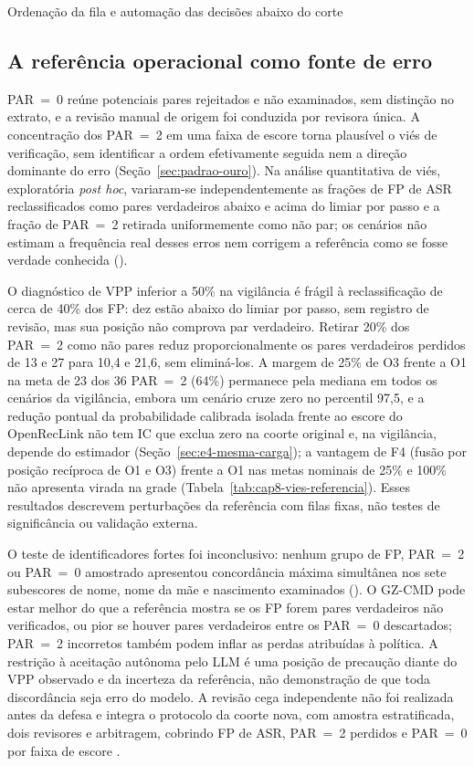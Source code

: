 \begin{chapter}{Ordenação da fila e automação das decisões abaixo do corte}
\subsection{A referência operacional como fonte de erro}\label{sec:e4-vies-referencia}

PAR~=~0 reúne potenciais pares rejeitados e não examinados, sem distinção no extrato, e a revisão manual de origem foi conduzida por revisora única. A concentração dos PAR~=~2 em uma faixa de escore torna plausível o viés de verificação, sem identificar a ordem efetivamente seguida nem a direção dominante do erro (Seção~\ref{sec:padrao-ouro}). Na análise quantitativa de viés, exploratória \textit{post hoc}, variaram-se independentemente as frações de FP de ASR reclassificados como pares verdadeiros abaixo e acima do limiar por passo e a fração de PAR~=~2 retirada uniformemente como não par; os cenários não estimam a frequência real desses erros nem corrigem a referência como se fosse verdade conhecida ().



O diagnóstico de VPP inferior a 50\% na vigilância é frágil à reclassificação de cerca de 40\% dos FP: dez estão abaixo do limiar por passo, sem registro de revisão, mas sua posição não comprova par verdadeiro. Retirar 20\% dos PAR~=~2 como não pares reduz proporcionalmente os pares verdadeiros perdidos de 13 e 27 para 10,4 e 21,6, sem eliminá-los. A margem de 25\% de O3 frente a O1 na meta de 23 dos 36 PAR~=~2 (64\%) permanece pela mediana em todos os cenários da vigilância, embora um cenário cruze zero no percentil 97,5, e a redução pontual da probabilidade calibrada isolada frente ao escore do OpenRecLink não tem IC que exclua zero na coorte original e, na vigilância, depende do estimador (Seção~\ref{sec:e4-mesma-carga}); a vantagem de F4 (fusão por posição recíproca de O1 e O3) frente a O1 nas metas nominais de 25\% e 100\% não apresenta virada na grade (Tabela~\ref{tab:cap8-vies-referencia}). Esses resultados descrevem perturbações da referência com filas fixas, não testes de significância ou validação externa.

O teste de identificadores fortes foi inconclusivo: nenhum grupo de FP, PAR~=~2 ou PAR~=~0 amostrado apresentou concordância máxima simultânea nos sete subescores de nome, nome da mãe e nascimento examinados (). O GZ-CMD pode estar melhor do que a referência mostra se os FP forem pares verdadeiros não verificados, ou pior se houver pares verdadeiros entre os PAR~=~0 descartados; PAR~=~2 incorretos também podem inflar as perdas atribuídas à política. A restrição à aceitação autônoma pelo LLM é uma posição de precaução diante do VPP observado e da incerteza da referência, não demonstração de que toda discordância seja erro do modelo. A revisão cega independente não foi realizada antes da defesa e integra o protocolo da coorte nova, com amostra estratificada, dois revisores e arbitragem, cobrindo FP de ASR, PAR~=~2 perdidos e PAR~=~0 por faixa de escore \cite{Lam2026clerical}.


\end{chapter}
